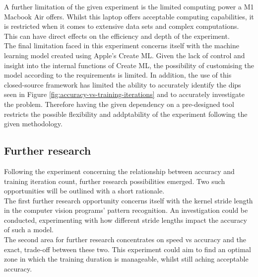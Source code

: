 A further limitation of the given experiment is the limited computing power a M1 Macbook Air offers. Whilst this laptop offers acceptable computing capabilities, it is restricted when it comes to extensive data sets and complex computations. This can have direct effects on the efficiency and depth of the experiment. \\

The final limitation faced in this experiment concerns itself with the machine learning model created using Apple's Create ML. 
Given the lack of control and insight into the internal functions of Create ML, the possibility of customising the model according to the
requirements is limited. In addition, the use of this closed-source framework has limited the ability to accurately identify the dips 
seen in Figure \ref{fig:accuracy-vs-training-iterations} and to accurately investigate the problem. 
Therefore having the given dependency on a pre-designed tool restricts the possible flexibility and addptability of the experiment following the given methodology.  \\

\newpage

\subsection{Further research}
Following the experiment concerning the relationship between accuracy and training iteration count, further research possibilities emerged. Two such opportunities will be outlined with a short rationale.  \\

The first further research opportunity concerns itself with the kernel stride length in the computer vision programs' pattern recognition. An investigation could be conducted, experimenting with how different stride lengths impact the accuracy of such a model. \\

The second area for further research concentrates on speed vs accuracy and the exact, trade-off between these two. This experiment could aim to find an optimal zone in which the training duration is manageable, whilst still aching acceptable accuracy.  \\




